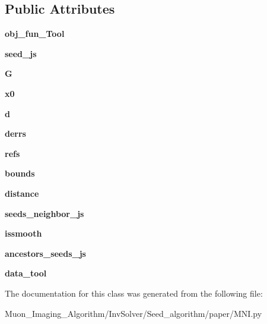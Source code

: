 \subsection*{Public Attributes}
\begin{DoxyCompactItemize}
\item 
\mbox{\label{classMNI_1_1MNI__solver_a1f23317bc6fbb9196d401cf02ceb55f5}} 
{\bfseries obj\+\_\+fun\+\_\+\+Tool}
\item 
\mbox{\label{classMNI_1_1MNI__solver_a79e71c77c5ef4fd4bad6c9f576a6bc4b}} 
{\bfseries seed\+\_\+js}
\item 
\mbox{\label{classMNI_1_1MNI__solver_a75251d890b17136752aa9fd4f78155c3}} 
{\bfseries G}
\item 
\mbox{\label{classMNI_1_1MNI__solver_a66cf04fa0ca1f77922f19620658f8441}} 
{\bfseries x0}
\item 
\mbox{\label{classMNI_1_1MNI__solver_ad01fb3b39b1e3231ce1cb9d332e775c9}} 
{\bfseries d}
\item 
\mbox{\label{classMNI_1_1MNI__solver_a88fe7887a42214198bec9452a26bba65}} 
{\bfseries derrs}
\item 
\mbox{\label{classMNI_1_1MNI__solver_a5dccfeaefea462eb1ebc3000f9f0df7f}} 
{\bfseries refs}
\item 
\mbox{\label{classMNI_1_1MNI__solver_a70e1ec0d97d6c28830f7acd01f0e80c9}} 
{\bfseries bounds}
\item 
\mbox{\label{classMNI_1_1MNI__solver_a10af5614e00a4c13f1edd31d8e187543}} 
{\bfseries distance}
\item 
\mbox{\label{classMNI_1_1MNI__solver_a9ea6748a021bfd4ea4eb4b6220bc1e76}} 
{\bfseries seeds\+\_\+neighbor\+\_\+js}
\item 
\mbox{\label{classMNI_1_1MNI__solver_a774c32f7f3862fcb9b66c56b5d3310d6}} 
{\bfseries issmooth}
\item 
\mbox{\label{classMNI_1_1MNI__solver_ab9caf422a35adffce4043512b07a6921}} 
{\bfseries ancestors\+\_\+seeds\+\_\+js}
\item 
\mbox{\label{classMNI_1_1MNI__solver_a1ca69eda1f37c9764faa0a27966403ed}} 
{\bfseries data\+\_\+tool}
\end{DoxyCompactItemize}


The documentation for this class was generated from the following file\+:\begin{DoxyCompactItemize}
\item 
Muon\+\_\+\+Imaging\+\_\+\+Algorithm/\+Inv\+Solver/\+Seed\+\_\+algorithm/paper/M\+N\+I.\+py\end{DoxyCompactItemize}
